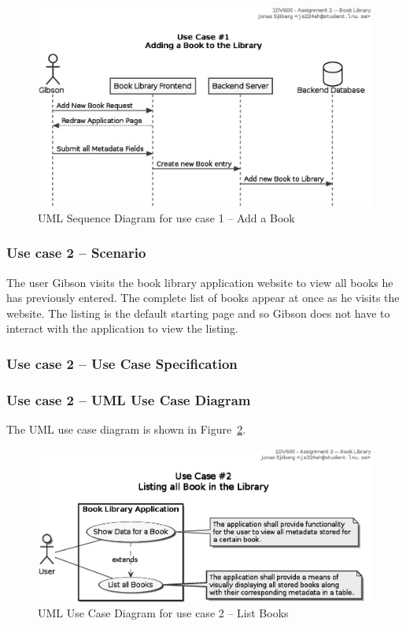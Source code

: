 \begin{figure}[htbp]
  \centering
  \includegraphics[width=\linewidth]{include/uml-use-case-1-seq.eps}
  \caption{UML Sequence Diagram for use case 1 -- Add a Book}
  \label{fig:uml-usecase1seq}
\end{figure}




\subsubsection{Use case 2 -- Scenario}\label{task-1a-usecase2}
The user Gibson visits the book library application website to view all books
he has previously entered. The complete list of books appear at once as he
visits the website. The listing is the default starting page and so Gibson does
not have to interact with the application to view the listing.


\subsubsection{Use case 2 -- Use Case Specification}\label{task-1a-usecase2spec}



\subsubsection{Use case 2 -- UML Use Case Diagram}\label{task-1a-usecase2uml}
The UML use case diagram is shown in Figure~\ref{fig:uml-usecase2}.

\begin{figure}[htbp]
  \centering
  \includegraphics[width=0.75\linewidth]{include/uml-use-case-2.eps}
  \caption{UML Use Case Diagram for use case 2 -- List Books}
  \label{fig:uml-usecase2}
\end{figure}


